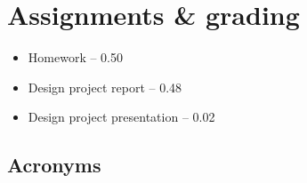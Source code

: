 \documentclass[11pt,letterpaper]{article}
\begin{document}
\section{Assignments \& grading}
\begin{itemize}[begin-vspace=0ex,item-vspace=-0.5ex,begin-extra-vspace=1ex,para-vspace=1ex,left-margin=2.25ex,item-indent=0ex]
    \item Homework -- 0.50
    \item Design project report -- 0.48
    \item Design project presentation -- 0.02
\end{itemize}


%
%


\newpage


\begin{appendices}


    \renewcommand{\thesection}{\Roman{section}}


    \section{Acronyms}
    \printnoidxglossary[title={}]


\end{appendices}
\end{document}
